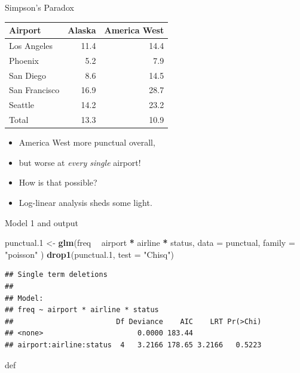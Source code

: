 \documentclass[ignorenonframetext,]{beamer}
\newenvironment{Shaded}{\begin{snugshade}}{\end{snugshade}}
\newcommand{\DataTypeTok}[1]{\textcolor[rgb]{0.13,0.29,0.53}{#1}}
\newcommand{\FloatTok}[1]{\textcolor[rgb]{0.00,0.00,0.81}{#1}}
\newcommand{\KeywordTok}[1]{\textcolor[rgb]{0.13,0.29,0.53}{\textbf{#1}}}
\newcommand{\NormalTok}[1]{#1}
\newcommand{\OperatorTok}[1]{\textcolor[rgb]{0.81,0.36,0.00}{\textbf{#1}}}
\newcommand{\StringTok}[1]{\textcolor[rgb]{0.31,0.60,0.02}{#1}}
\begin{document}
\begin{frame}{Simpson's Paradox}
\protect\hypertarget{simpsons-paradox}{}

\begin{tabular}{|l|rr|}
\hline
Airport & Alaska & America West\\
\hline
Los Angeles & 11.4 & 14.4\\
Phoenix & 5.2 & 7.9\\
San Diego & 8.6 & 14.5\\
San Francisco & 16.9 & 28.7\\
Seattle & 14.2 & 23.2 \\
\hline
Total & 13.3 & 10.9 \\
\hline
\end{tabular}

\begin{itemize}
\item
  America West more punctual overall,
\item
  but worse at \emph{every single} airport!
\item
  How is that possible?
\item
  Log-linear analysis sheds some light.
\end{itemize}

\end{frame}

\begin{frame}[fragile]{Model 1 and output}
\protect\hypertarget{model-1-and-output}{}

\begin{Shaded}
\begin{Highlighting}[]
\NormalTok{punctual}\FloatTok{.1}\NormalTok{ <-}\StringTok{ }\KeywordTok{glm}\NormalTok{(freq }\OperatorTok{~}\StringTok{ }\NormalTok{airport }\OperatorTok{*}\StringTok{ }\NormalTok{airline }\OperatorTok{*}\StringTok{ }\NormalTok{status,}
  \DataTypeTok{data =}\NormalTok{ punctual, }\DataTypeTok{family =} \StringTok{"poisson"}
\NormalTok{)}
\KeywordTok{drop1}\NormalTok{(punctual}\FloatTok{.1}\NormalTok{, }\DataTypeTok{test =} \StringTok{"Chisq"}\NormalTok{)}
\end{Highlighting}
\end{Shaded}

\begin{verbatim}
## Single term deletions
## 
## Model:
## freq ~ airport * airline * status
##                        Df Deviance    AIC    LRT Pr(>Chi)
## <none>                      0.0000 183.44                
## airport:airline:status  4   3.2166 178.65 3.2166   0.5223
\end{verbatim}

def

\end{frame}
\end{document}
